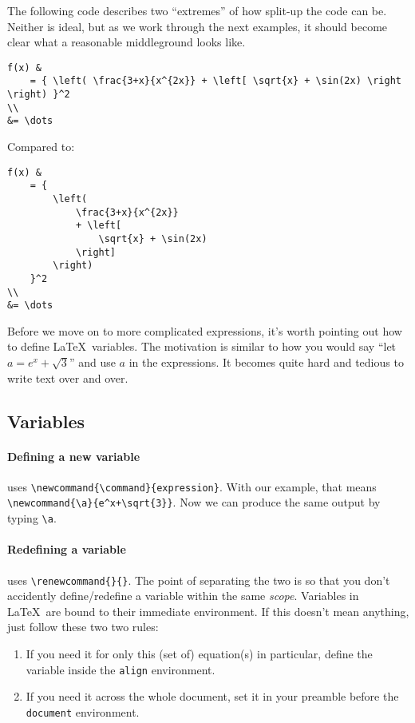 The following code describes two ``extremes'' of how split-up the code can be.
Neither is ideal, but as we work through the next examples, it should become clear what a reasonable middleground looks like.
\begin{lstlisting}
f(x) &
    = { \left( \frac{3+x}{x^{2x}} + \left[ \sqrt{x} + \sin(2x) \right \right) }^2
\\
&= \dots
\end{lstlisting}
Compared to:
\begin{lstlisting}
f(x) &
    = {
        \left( 
            \frac{3+x}{x^{2x}}
            + \left[ 
                \sqrt{x} + \sin(2x)
            \right]
        \right)
    }^2
\\
&= \dots
\end{lstlisting}

Before we move on to more complicated expressions, it's worth pointing out how to define \LaTeX\ variables.
The motivation is similar to how you would say ``let \(a = e^x+\sqrt{3}\)'' and use \(a\) in the expressions. It becomes quite hard and tedious to write text over and over.

\subsection{Variables}
\paragraph{Defining a new variable} uses \verb|\newcommand{\command}{expression}|.
With our example, that means \verb|\newcommand{\a}{e^x+\sqrt{3}}|.
Now we can produce the same output by typing \verb|\a|.

\paragraph{Redefining a variable} uses \verb|\renewcommand{}{}|. The point of separating the two is so that you don't accidently define/redefine a variable within the same \emph{scope}.
Variables in \LaTeX\ are bound to their immediate environment.
If this doesn't mean anything, just follow these two two rules:
\begin{enumerate}
    \item If you need it for only this (set of) equation(s) in particular, define the variable inside the \verb|align| environment.
    \item If you need it across the whole document, set it in your preamble before the \texttt{document} environment.
\end{enumerate}

